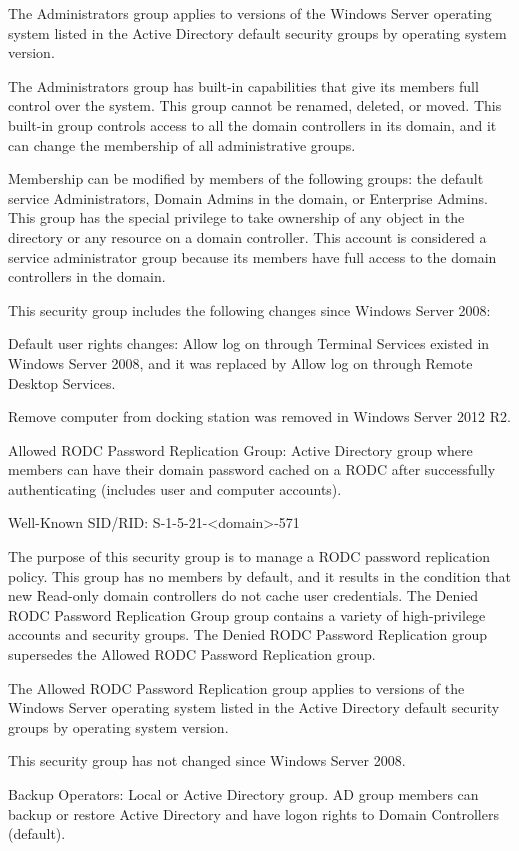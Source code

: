 The Administrators group applies to versions of the Windows Server operating system listed in the Active Directory default security groups by operating system version.

The Administrators group has built-in capabilities that give its members full control over the system. This group cannot be renamed, deleted, or moved. This built-in group controls access to all the domain controllers in its domain, and it can change the membership of all administrative groups.

Membership can be modified by members of the following groups: the default service Administrators, Domain Admins in the domain, or Enterprise Admins. This group has the special privilege to take ownership of any object in the directory or any resource on a domain controller. This account is considered a service administrator group because its members have full access to the domain controllers in the domain.

This security group includes the following changes since Windows Server 2008:

Default user rights changes: Allow log on through Terminal Services existed in Windows Server 2008, and it was replaced by Allow log on through Remote Desktop Services.

Remove computer from docking station was removed in Windows Server 2012 R2.

Allowed RODC Password Replication Group: Active Directory group where members can have their domain password cached on a RODC after successfully authenticating (includes user and computer accounts).

Well-Known SID/RID: S-1-5-21-<domain>-571

The purpose of this security group is to manage a RODC password replication policy. This group has no members by default, and it results in the condition that new Read-only domain controllers do not cache user credentials. The Denied RODC Password Replication Group group contains a variety of high-privilege accounts and security groups. The Denied RODC Password Replication group supersedes the Allowed RODC Password Replication group.

The Allowed RODC Password Replication group applies to versions of the Windows Server operating system listed in the Active Directory default security groups by operating system version.

This security group has not changed since Windows Server 2008.

Backup Operators: Local or Active Directory group. AD group members can backup or restore Active Directory and have logon rights to Domain Controllers (default).

